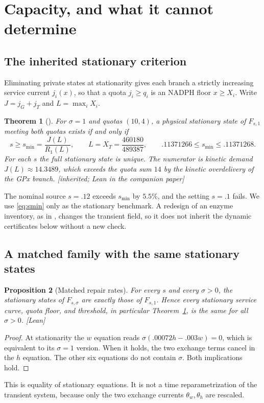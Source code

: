 \documentclass[11pt,a4paper]{article}
\theoremstyle{plain}
\newtheorem{theorem}{Theorem}[section]
\newtheorem{proposition}[theorem]{Proposition}
\theoremstyle{definition}
\theoremstyle{remark}
\newcommand{\evid}[1]{\textnormal{\textsf{\small[#1]}}}
\begin{document}
\section{Capacity, and what it cannot determine}\label{sec:capacity}

\subsection{The inherited stationary criterion}
Eliminating private states at stationarity gives each branch a strictly
increasing service current $j_i(x)$, so that a quota $j_i\ge q_i$ is an NADPH
floor $x\ge X_i$. Write $J=j_G+j_T$ and $L=\max_iX_i$.

\begin{theorem}[\citep{companionNADPH}]\label{thm:capacity}
For $\sigma=1$ and quotas $(10,4)$, a physical stationary state of
$F_{s,1}$ meeting both quotas exists if and only if
\begin{equation}\label{eq:smin}
s\ge s_{\min}=\frac{J(L)}{R_1(L)},\qquad
L=X_T=\frac{460180}{489387},\qquad .11371266\le s_{\min}\le.11371268 .
\end{equation}
For each $s$ the full stationary state is unique. The numerator is kinetic
demand $J(L)\approx14.3489$, which exceeds the quota sum $14$ by the kinetic
overdelivery of the GPx branch. \evid{inherited; Lean in the companion paper}
\end{theorem}

The nominal source $s=.12$ exceeds $s_{\min}$ by $5.5\%$, and the setting
$s=.1$ fails. We use \eqref{eq:smin} only as the stationary benchmark.
A redesign of an enzyme inventory, as in \citep{companionNADPH}, changes the
transient field, so it does not inherit the dynamic certificates below without
a new check.

\subsection{A matched family with the same stationary states}

\begin{proposition}[Matched repair rates]\label{prop:stationary}
For every $s$ and every $\sigma>0$, the stationary states of $F_{s,\sigma}$
are exactly those of $F_{s,1}$. Hence every stationary service curve, quota
floor, and threshold, in particular Theorem~\ref{thm:capacity}, is the same for
all $\sigma>0$. \evid{Lean}
\end{proposition}
\begin{proof}
At stationarity the $w$ equation reads $\sigma(.00072h-.003w)=0$, which is
equivalent to its $\sigma=1$ version. When it holds, the two exchange terms
cancel in the $h$ equation. The other six equations do not contain $\sigma$.
Both implications hold.
\end{proof}
This is equality of stationary equations. It is not a time reparametrization
of the transient system, because only the two exchange currents $\theta_w,\theta_h$ are rescaled.
\end{document}
